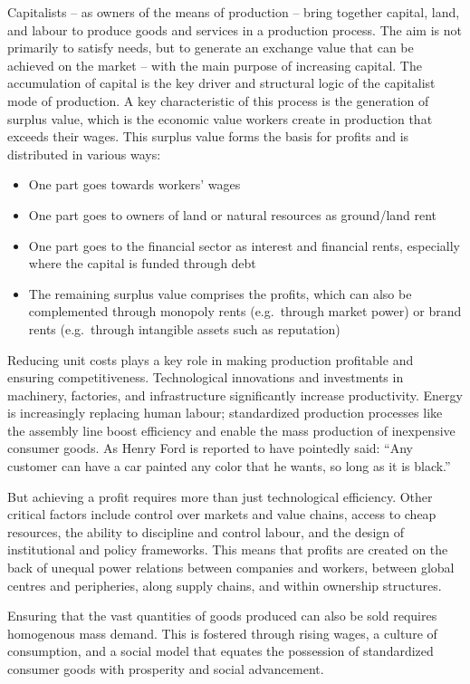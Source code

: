 \documentclass[
  a4paper,
  openany]{book}
\begin{document}
Capitalists -- as owners of the means of production -- bring together
capital, land, and labour to produce goods and services in a production
process. The aim is not primarily to satisfy needs, but to generate an
exchange value that can be achieved on the market -- with the main
purpose of increasing capital. The accumulation of capital is the key
driver and structural logic of the capitalist mode of production. A key
characteristic of this process is the generation of surplus value, which
is the economic value workers create in production that exceeds their
wages. This surplus value forms the basis for profits and is distributed
in various ways:

\begin{itemize}
\item
  One part goes towards workers' wages
\item
  One part goes to owners of land or natural resources as ground/land
  rent
\item
  One part goes to the financial sector as interest and financial rents,
  especially where the capital is funded through debt
\item
  The remaining surplus value comprises the profits, which can also be
  complemented through monopoly rents (e.g.~through market power) or
  brand rents (e.g.~through intangible assets such as reputation)
\end{itemize}

Reducing unit costs plays a key role in making production profitable and
ensuring competitiveness. Technological innovations and investments in
machinery, factories, and infrastructure significantly increase
productivity. Energy is increasingly replacing human labour;
standardized production processes like the assembly line boost
efficiency and enable the mass production of inexpensive consumer goods.
As Henry Ford is reported to have pointedly said: ``Any customer can
have a car painted any color that he wants, so long as it is black.''

But achieving a profit requires more than just technological efficiency.
Other critical factors include control over markets and value chains,
access to cheap resources, the ability to discipline and control labour,
and the design of institutional and policy frameworks. This means that
profits are created on the back of unequal power relations between
companies and workers, between global centres and peripheries, along
supply chains, and within ownership structures.

Ensuring that the vast quantities of goods produced can also be sold
requires homogenous mass demand. This is fostered through rising wages,
a culture of consumption, and a social model that equates the possession
of standardized consumer goods with prosperity and social advancement.
\end{document}

